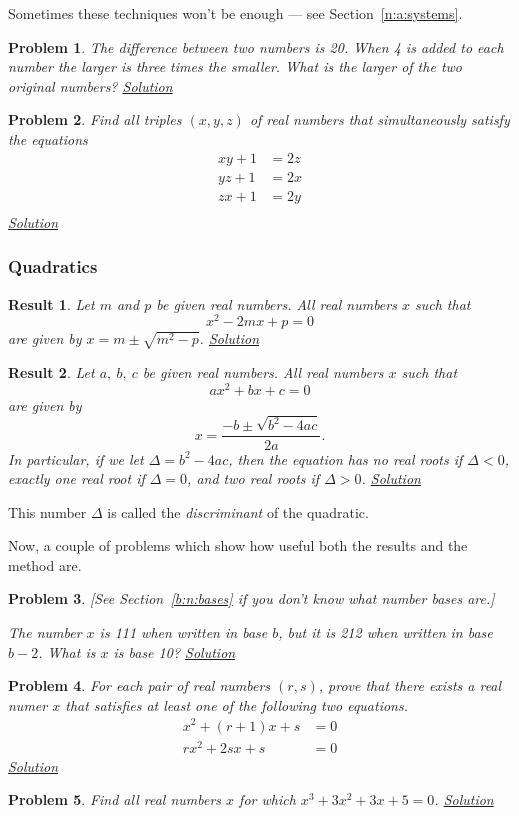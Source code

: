 \documentclass{amsart}
\newtheorem{problem}{Problem}[subsubsection]
\newtheorem{result}{Result}[subsubsection]
\begin{document}
Sometimes these techniques won't be enough --- see Section~\ref{n:a:systems}.
\begin{problem}\label{p:b:a:systems:1}
  The difference between two numbers is 20. When 4 is added to each number the
  larger is three times the smaller. What is the larger of the two original
  numbers?
  \hyperlink{s:b:a:systems:1}{Solution}
\end{problem}
\begin{problem}\label{p:b:a:systems:2}
  Find all triples $(x,y,z)$ of real numbers that simultaneously satisfy the
  equations
  \begin{align*}
    xy+1&=2z \\
    yz+1&=2x \\
    zx+1&=2y \\
  \end{align*}
  \hyperlink{s:b:a:systems:2}{Solution}
\end{problem}
\subsubsection{Quadratics}
\begin{result}\label{r:b:a:quad:1}
  Let $m$ and $p$ be given real numbers. All real numbers $x$ such that
  \[x^2-2mx+p=0\] are given by $x=m\pm\sqrt{m^2-p}$.
  \hyperlink{sr:b:a:quad:1}{Solution}
\end{result}
\begin{result}\label{r:b:a:quad:2}
  Let $a,\ b,\ c$ be given real numbers. All real numbers $x$ such that
  \[ax^2+bx+c=0\] are given by \[x=\frac{-b\pm\sqrt{b^2-4ac}}{2a}.\]
  In particular, if we let $\Delta=b^2-4ac$, then the equation has no real roots
  if $\Delta<0$, exactly one real root if $\Delta=0$, and two real roots if
  $\Delta>0$.
  \hyperlink{sr:b:a:quad:2}{Solution}
\end{result}
This number $\Delta$ is called the \emph{discriminant} of the quadratic.

Now, a couple of problems which show how useful both the results and the method
are.
\begin{problem}\label{p:b:a:quad:1}
  [See Section~\ref{b:n:bases} if you don't know what number bases are.]

  The number $x$ is 111 when written in base $b$, but it is 212 when written in
  base $b-2$. What is $x$ is base 10?
  \hyperlink{sp:b:a:quad:1}{Solution}
\end{problem}
\begin{problem}\label{p:b:a:quad:2}
  For each pair of real numbers $(r,s)$, prove that there exists a real numer
  $x$ that satisfies at least one of the following two equations.
  \begin{align*}
    x^2+(r+1)x+s&=0 \\
    rx^2+2sx+s&=0
  \end{align*}
  \hyperlink{sp:b:a:quad:2}{Solution}
\end{problem}
\begin{problem}\label{p:b:a:quad:3}
  Find all real numbers $x$ for which $x^3+3x^2+3x+5=0$.
  \hyperlink{sp:b:a:quad:3}{Solution}
\end{problem}
\end{document}
